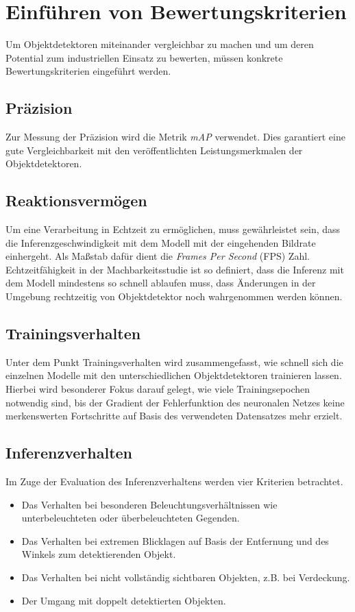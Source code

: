 \section{Einführen von Bewertungskriterien}

Um Objektdetektoren miteinander vergleichbar zu machen und um deren Potential zum industriellen Einsatz zu bewerten, müssen konkrete Bewertungskriterien eingeführt werden.

\subsection*{Präzision}

Zur Messung der Präzision wird die Metrik \textit{mAP} verwendet. Dies garantiert eine gute Vergleichbarkeit mit den veröffentlichten Leistungsmerkmalen der Objektdetektoren.

\subsection*{Reaktionsvermögen}

Um eine Verarbeitung in Echtzeit zu ermöglichen, muss gewährleistet sein, dass die Inferenzgeschwindigkeit mit dem Modell mit der eingehenden Bildrate einhergeht. Als Maßstab dafür dient die \textit{Frames Per Second} (FPS) Zahl. Echtzeitfähigkeit in der Machbarkeitsstudie ist so definiert, dass die Inferenz mit dem Modell mindestens so schnell ablaufen muss, dass Änderungen in der Umgebung rechtzeitig von Objektdetektor noch wahrgenommen werden können. 

\subsection*{Trainingsverhalten}

Unter dem Punkt Trainingsverhalten wird zusammengefasst, wie schnell sich die einzelnen Modelle mit den unterschiedlichen Objektdetektoren trainieren lassen. Hierbei wird besonderer Fokus darauf gelegt, wie viele Trainingsepochen notwendig sind, bis der Gradient der Fehlerfunktion des neuronalen Netzes keine merkenswerten Fortschritte auf Basis des verwendeten Datensatzes mehr erzielt.

\subsection*{Inferenzverhalten}

Im Zuge der Evaluation des Inferenzverhaltens werden vier Kriterien betrachtet. 

\begin{itemize}
	\item Das Verhalten bei besonderen Beleuchtungsverhältnissen wie unterbeleuchteten oder überbeleuchteten Gegenden.
	\item Das Verhalten bei extremen Blicklagen auf Basis der Entfernung und des Winkels zum detektierenden Objekt.
	\item Das Verhalten bei nicht vollständig sichtbaren Objekten, z.B. bei Verdeckung.
	\item Der Umgang mit doppelt detektierten Objekten. 
\end{itemize}
